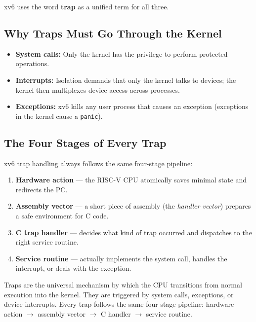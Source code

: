 \documentclass[11pt, a4paper]{article}
\begin{document}
xv6 uses the word \textbf{trap} as a unified term for all three.

\subsection{Why Traps Must Go Through the Kernel}

\begin{itemize}[leftmargin=1.5em]
  \item \textbf{System calls:} Only the kernel has the privilege to perform protected operations.
  \item \textbf{Interrupts:} Isolation demands that only the kernel talks to devices; the kernel then multiplexes device access across processes.
  \item \textbf{Exceptions:} xv6 kills any user process that causes an exception (exceptions in the kernel cause a \lstinline|panic|).
\end{itemize}

\subsection{The Four Stages of Every Trap}

xv6 trap handling always follows the same four-stage pipeline:

\begin{enumerate}[leftmargin=2em]
  \item \textbf{Hardware action} --- the RISC-V CPU atomically saves minimal state and redirects the PC.
  \item \textbf{Assembly vector} --- a short piece of assembly (the \emph{handler vector}) prepares a safe environment for C code.
  \item \textbf{C trap handler} --- decides what kind of trap occurred and dispatches to the right service routine.
  \item \textbf{Service routine} --- actually implements the system call, handles the interrupt, or deals with the exception.
\end{enumerate}

\begin{tcolorbox}[summary, title={Section Summary}]
Traps are the universal mechanism by which the CPU transitions from normal execution into the kernel. They are triggered by system calls, exceptions, or device interrupts. Every trap follows the same four-stage pipeline: hardware action $\to$ assembly vector $\to$ C handler $\to$ service routine.
\end{tcolorbox}
\end{document}
